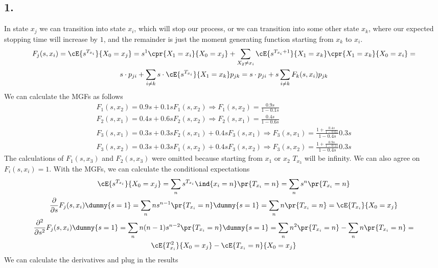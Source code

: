 \subsection*{1.}
In state $x_j$ we can transition into state $x_i$, which will stop our process, or we can transition into some other state $x_k$, where our expected stopping time will increase by $1$, and the remainder is just the moment generating function starting from $x_k$ to $x_i$.
\begin{gather*}
    F_j (s,x_i)=\cE{s^{T_{x_i}}}{X_0=x_j} = s^1 \cpr{X_1 = x_i}{X_0 = x_j} + \sum_{X_2 \neq x_i} \cE{s^{T_{x_i}+1}}{X_1=x_k} \cpr{X_1=x_k}{X_0=x_i} = \\
    s\cdot  p_{ji} + \sum_{i \neq k} s \cdot \cE{s^{T_{x_i}}}{X_1=x_k} p_{jk} = s \cdot p_{ji} +s  \sum_{i \neq k} F_k(s,x_i) p_{jk}
\end{gather*}
We can calculate the MGFs as follows
\begin{gather*}
    F_1(s,x_2) = 0.9s + 0.1 s F_1(s,x_2) \Longrightarrow  F_1(s,x_2) = \frac{0.9s}{1-0.1s} \\
    F_2(s,x_1) = 0.4s + 0.6 s F_2(s,x_2) \Longrightarrow F_2(s,x_1) = \frac{0.4s}{1-0.6s} \\
    F_3(s,x_1) = 0.3 s + 0.3 sF_2(s,x_1) + 0.4 sF_3(s,x_1) \Longrightarrow F_3(s,x_1)= \frac{1+\frac{0.4s}{1-0.6s}}{1-0.4s}0.3s\\
    F_3(s,x_2) = 0.3 s + 0.3s F_1(s,x_2) + 0.4 sF_3(s,x_2) \Longrightarrow F_3(s,x_2)= \frac{1+\frac{0.9s}{1-0.1s}}{1-0.4s}0.3s 
\end{gather*}
The calculations of $F_1(s,x_3)$ and $F_2(s,x_3)$ were omitted because starting from $x_1$ or $x_2$ $T_{x_3}$ will be infinity. We can also agree on $F_i(s,x_i)=1$.
With the MGFs, we can calculate the conditional expectations 
\begin{gather*}
    \cE{s^{T_{x_i}}}{X_0=x_j}=\sum_n s^{T_{x_i}}\ind{x_i=n}\pr{T_{x_i}=n} = \sum_n s^n \pr{T_{x_i}=n} \\
    \frac{\partial}{\partial s}F_j(s,x_i)\dummy{s=1} = \sum_n n s^{n-1} \pr{T_{x_i}=n}\dummy{s=1} = \sum_n n \pr{T_{x_i}=n}=\cE{T_{x_i}}{X_0=x_j} \\
    \frac{\partial^2}{\partial s^2}F_j(s,x_i)\dummy{s=1} = \sum_n n(n-1) s^{n-2} \pr{T_{x_i}=n}\dummy{s=1} = \sum_n n^2 \pr{T_{x_i}=n} - \sum_n n \pr{T_{x_i}=n} = \\ \cE{T^2_{x_i}}{X_0=x_j}- \cE{T_{x_i}=n}{X_0=x_j}
\end{gather*}
We can calculate the derivatives and plug in the results
